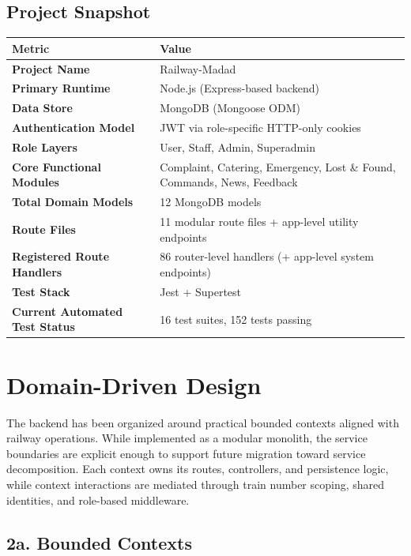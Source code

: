 \documentclass[12pt,a4paper]{report}
\renewcommand{\toprule}{\hline\hline}
\renewcommand{\midrule}{\hline}
\renewcommand{\bottomrule}{\hline\hline}
\begin{document}
\section{Project Snapshot}

\begin{table}[H]
\centering
\begin{tabularx}{\textwidth}{>{\bfseries}p{}Y}
\toprule
{}
\textcolor{TableHeaderText}{Metric} & \textcolor{TableHeaderText}{Value} \\
\midrule
Project Name & Railway-Madad \\
Primary Runtime & Node.js (Express-based backend) \\
Data Store & MongoDB (Mongoose ODM) \\
Authentication Model & JWT via role-specific HTTP-only cookies \\
Role Layers & User, Staff, Admin, Superadmin \\
Core Functional Modules & Complaint, Catering, Emergency, Lost \& Found, Commands, News, Feedback \\
Total Domain Models & 12 MongoDB models \\
Route Files & 11 modular route files + app-level utility endpoints \\
Registered Route Handlers & 86 router-level handlers (+ app-level system endpoints) \\
Test Stack & Jest + Supertest \\
Current Automated Test Status & 16 test suites, 152 tests passing \\
\bottomrule
\end{tabularx}
\end{table}

\chapter{Domain-Driven Design}

The backend has been organized around practical bounded contexts aligned with railway operations. While implemented as a modular monolith, the service boundaries are explicit enough to support future migration toward service decomposition. Each context owns its routes, controllers, and persistence logic, while context interactions are mediated through train number scoping, shared identities, and role-based middleware.

\section{2a. Bounded Contexts}
\end{document}
